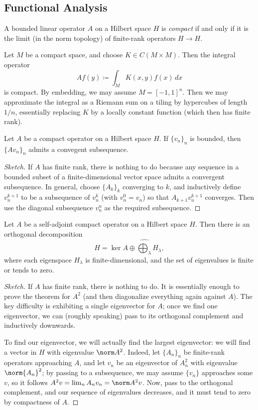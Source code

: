 \documentclass{article}
\begin{document}
\subsection{Functional Analysis}
\begin{definition}[compact]
	A bounded linear operator $A$ on a Hilbert space $H$ is \textit{compact} if and only if it is the limit (in the norm topology) of finite-rank operators $H\to H$.
\end{definition}
\begin{example}
	Let $M$ be a compact space, and choose $K\in C(M\times M)$. Then the integral operator
	\[Af(y)\coloneqq\int_MK(x,y)f(x)\,dx\]
	is compact. By embedding, we may assume $M=[-1,1]^n$. Then we may approximate the integral as a Riemann sum on a tiling by hypercubes of length $1/n$, essentially replacing $K$ by a locally constant function (which then has finite rank).
\end{example}
\begin{lemma}
	Let $A$ be a compact operator on a Hilbert space $H$. If $\{v_n\}_n$ is bounded, then $\{Av_n\}_n$ admits a convegent subsequence.
\end{lemma}
\begin{proof}[Sketch]
	If $A$ has finite rank, there is nothing to do because any sequence in a bounded subset of a finite-dimensional vector space admits a convergent subsequence. In general, choose $\{A_k\}_k$ converging to $k$, and inductively define $v_n^{k+1}$ to be a subsequence of $v_n^k$ (with $v_n^0=v_n$) so that $A_{k+1}v_n^{k+1}$ converges. Then use the diagonal subsequence $v_n^n$ as the required subsequence.
\end{proof}
\begin{theorem}
	Let $A$ be a self-adjoint compact operator on a Hilbert space $H$. Then there is an orthogonal decomposition
	\[H=\ker A\oplus\widehat{\bigoplus_\lambda}H_\lambda,\]
	where each eigenspace $H_\lambda$ is finite-dimensional, and the set of eigenvalues is finite or tends to zero.
\end{theorem}
\begin{proof}[Sketch]
	If $A$ has finite rank, there is nothing to do. It is essentially enough to prove the theorem for $A^2$ (and then diagonalize everything again against $A$). The key difficulty is exhibiting a single eigenvector for $A$; once we find one eigenvector, we can (roughly speaking) pass to its orthogonal complement and inductively downwards.

	To find our eigenvector, we will actually find the largest eigenvector: we will find a vector in $H$ with eigenvalue $\norm A^2$. Indeed, let $\{A_n\}_n$ be finite-rank operators approaching $A$, and let $v_n$ be an eigenvector of $A_n^2$ with eigenvalue $\norm {A_n}^2$; by passing to a subsequence, we may assume $\{v_n\}$ approaches some $v$, so it follows $A^2v=\lim_nA_nv_n=\norm A^2v$. Now, pass to the orthogonal complement, and our sequence of eigenvalues decreases, and it must tend to zero by compactness of $A$.
\end{proof}
\end{document}
